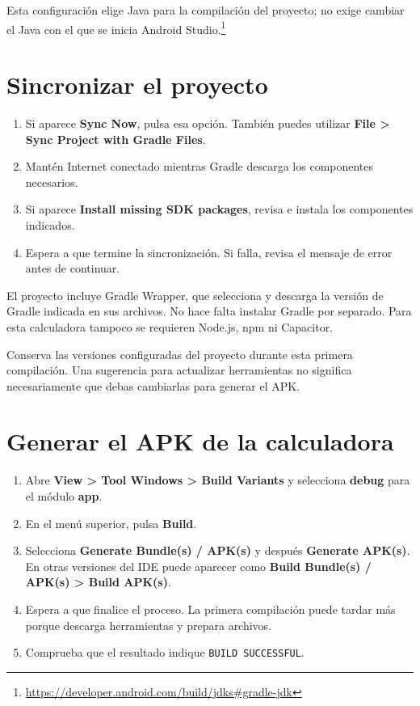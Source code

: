 \documentclass[12pt,a4paper]{article}
\begin{document}
Esta configuración elige Java para la compilación del proyecto; no exige cambiar el Java con el que se inicia Android Studio.\footnote{\url{https://developer.android.com/build/jdks#gradle-jdk}}

\section{Sincronizar el proyecto}

\begin{enumerate}
    \item Si aparece \textbf{Sync Now}, pulsa esa opción. También puedes utilizar \textbf{File > Sync Project with Gradle Files}.
    \item Mantén Internet conectado mientras Gradle descarga los componentes necesarios.
    \item Si aparece \textbf{Install missing SDK packages}, revisa e instala los componentes indicados.
    \item Espera a que termine la sincronización. Si falla, revisa el mensaje de error antes de continuar.
\end{enumerate}

El proyecto incluye Gradle Wrapper, que selecciona y descarga la versión de Gradle indicada en sus archivos. No hace falta instalar Gradle por separado. Para esta calculadora tampoco se requieren Node.js, npm ni Capacitor.

Conserva las versiones configuradas del proyecto durante esta primera compilación. Una sugerencia para actualizar herramientas no significa necesariamente que debas cambiarlas para generar el APK.

\section{Generar el APK de la calculadora}

\begin{enumerate}
    \item Abre \textbf{View > Tool Windows > Build Variants} y selecciona \textbf{debug} para el módulo \textbf{app}.
    \item En el menú superior, pulsa \textbf{Build}.
    \item Selecciona \textbf{Generate Bundle(s) / APK(s)} y después \textbf{Generate APK(s)}. En otras versiones del IDE puede aparecer como \textbf{Build Bundle(s) / APK(s) > Build APK(s)}.
    \item Espera a que finalice el proceso. La primera compilación puede tardar más porque descarga herramientas y prepara archivos.
    \item Comprueba que el resultado indique \texttt{BUILD SUCCESSFUL}.
\end{enumerate}
\end{document}

